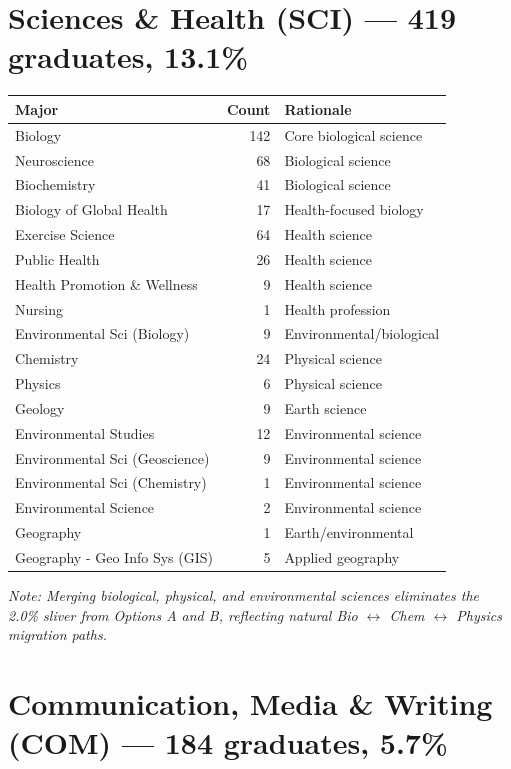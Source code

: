 \documentclass[
  11pt,
  letterpaper,
]{report}
\begin{document}
\section{Sciences \& Health (SCI) --- 419 graduates,
13.1\%}\label{sciences-health-sci-419-graduates-13.1}

\begin{longtable}[]{@{}lrl@{}}
\toprule\noalign{}
Major & Count & Rationale \\
\midrule\noalign{}
\endhead
\bottomrule\noalign{}
\endlastfoot
Biology & 142 & Core biological science \\
Neuroscience & 68 & Biological science \\
Biochemistry & 41 & Biological science \\
Biology of Global Health & 17 & Health-focused biology \\
Exercise Science & 64 & Health science \\
Public Health & 26 & Health science \\
Health Promotion \& Wellness & 9 & Health science \\
Nursing & 1 & Health profession \\
Environmental Sci (Biology) & 9 & Environmental/biological \\
Chemistry & 24 & Physical science \\
Physics & 6 & Physical science \\
Geology & 9 & Earth science \\
Environmental Studies & 12 & Environmental science \\
Environmental Sci (Geoscience) & 9 & Environmental science \\
Environmental Sci (Chemistry) & 1 & Environmental science \\
Environmental Science & 2 & Environmental science \\
Geography & 1 & Earth/environmental \\
Geography - Geo Info Sys (GIS) & 5 & Applied geography \\
\end{longtable}

\noindent\textit{Note: Merging biological, physical, and environmental sciences eliminates the 2.0\% sliver from Options A and B, reflecting natural Bio $\leftrightarrow$ Chem $\leftrightarrow$ Physics migration paths.}

\section{Communication, Media \& Writing (COM) --- 184 graduates,
5.7\%}\label{communication-media-writing-com-184-graduates-5.7}
\end{document}
